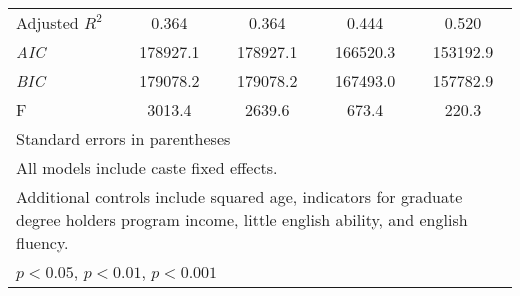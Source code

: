 \begin{table}[!htbp]
\begin{tabular}{@{\hskip\tabcolsep\extracolsep\fill}l*{4}{c}}
Adjusted \(R^{2}\)&    0.364         &    0.364         &    0.444         &    0.520         \\
\textit{AIC}    & 178927.1         & 178927.1         & 166520.3         & 153192.9         \\
\textit{BIC}    & 179078.2         & 179078.2         & 167493.0         & 157782.9         \\
F               &   3013.4         &   2639.6         &    673.4         &    220.3         \\
\bottomrule
\multicolumn{5}{p{\linewidth}}{\footnotesize Standard errors in parentheses}\\
\multicolumn{5}{p{\linewidth}}{\footnotesize All models include caste fixed effects.}\\
\multicolumn{5}{p{\linewidth}}{\footnotesize Additional controls include squared age, indicators for graduate degree holders program income, little english ability, and english fluency.}\\
\multicolumn{5}{p{\linewidth}}{\footnotesize \sym{*} \(p<0.05\), \sym{**} \(p<0.01\), \sym{***} \(p<0.001\)}\\
\end{tabular}
\end{table}
